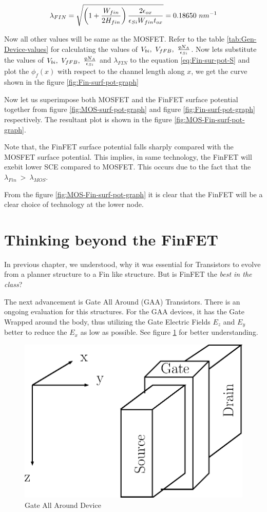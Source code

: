 \documentclass[a4paper]{article}
\begin{document}
\begin{equation}
  \lambda_{FIN} = \sqrt {\left( 1 + \frac{W_{fin}}{2 H_{fin}} \right) \frac{2 \epsilon_{ox}}{\epsilon_{Si}W_{fin} t_{ox}}} = 0.18650~nm^{-1}
\end{equation}

Now all other values will be same as the MOSFET. Refer to the table \ref{tab:Gen-Device-values} for calculating the values of $V_{bi},~V_{fFB},~\frac{qN_A} {\epsilon_{Si}}$. Now lets substitute the values of $V_{bi},~V_{fFB},~\frac{qN_A} {\epsilon_{Si}}$ and $\lambda_{FIN}$ to the equation \ref{eq:Fin-sur-pot-S} and plot the $\phi_f(x)$ with respect to the channel length along $x$, we get the curve shown in the figure \ref{fig:Fin-surf-pot-graph}

Now let us superimpose both MOSFET and the FinFET surface potential together from figure \ref{fig:MOS-surf-pot-graph} and figure \ref{fig:Fin-surf-pot-graph} respectively. The resultant plot is shown in the figure \ref{fig:MOS-Fin-surf-pot-graph}.

Note that, the FinFET surface potential falls sharply compared with the MOSFET surface potential. This implies, in same technology, the FinFET will exebit lower SCE compared to MOSFET. This occurs due to the fact that the $\lambda_{Fin}~>~\lambda_{MOS}$.

From the figure \ref{fig:MOS-Fin-surf-pot-graph} it is clear that the FinFET will be a clear choice of technology at the lower node.

\section{Thinking beyond the FinFET}

In previous chapter, we understood, why it was essential for Transistors to evolve from a planner structure to a Fin like structure. But is FinFET the \emph{best in the class}?

The next advancement is Gate All Around (GAA) Transistors. There is an ongoing evaluation for this structures. For the GAA devices, it has the Gate Wrapped around the body, thus utilizing the Gate Electric Fields $E_z$ and $E_y$ better to reduce the $E_x$ as low as possible. See figure \ref{fig:GAA} for better understanding.

\begin{figure}[!h]
  \includegraphics[scale=0.8]{./GAA-device.eps}
  \caption{Gate All Around Device}
  \label{fig:GAA}
\end{figure}
\end{document}
